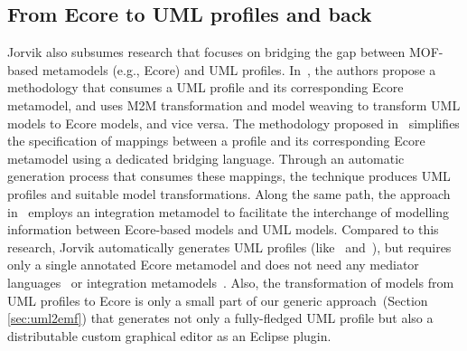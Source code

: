 \subsection{From Ecore to UML profiles and back}
Jorvik also subsumes research that focuses on bridging the gap between 
MOF-based metamodels (e.g., Ecore) and UML profiles.
In~\cite{abouzahra2005practical}, the authors propose a methodology 
that consumes a UML profile and its corresponding Ecore metamodel, and uses
M2M transformation and model weaving to transform UML models to 
Ecore models, and vice versa. The methodology proposed 
in~\cite{Wimmer2009:IJWIS} simplifies the specification of mappings 
between a profile and its corresponding Ecore metamodel using a dedicated 
bridging language. Through an automatic generation process that consumes
these mappings, the technique produces UML profiles and suitable model 
transformations. 
Along the same path, the approach in~\cite{Giachetti2009:ICRCIS} employs an 
integration metamodel to facilitate the interchange of modelling information 
between Ecore-based models and UML models. Compared to this research, Jorvik automatically generates UML 
profiles (like~\cite{Wimmer2009:IJWIS} 
and~\cite{Giachetti2009:ICRCIS}), but requires only a single annotated Ecore 
metamodel and does not need any mediator 
languages~\cite{Wimmer2009:IJWIS} 
or integration metamodels~\cite{Giachetti2009:ICRCIS}. Also, the transformation 
of models from UML profiles to Ecore is only a small part of our generic 
approach~(Section \ref{sec:uml2emf}) that generates not only a fully-fledged 
UML profile but also a distributable custom graphical editor as an Eclipse plugin. 

 




